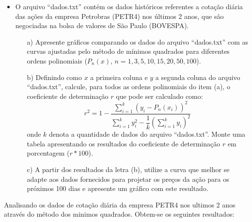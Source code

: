 \documentclass{article}
\newcounter{execs}
\newcommand{\exec}[0]{\addtocounter{execs}{1}\item[\textbf{\arabic{execs}.}]}
\begin{document}
\thispagestyle{first}
%    

\begin{itemize}

\exec O arquivo ``dados.txt'' contém os dados históricos referentes a cotação diária das ações da empresa Petrobras (PETR4) nos últimos 2 anos, que são negociadas na bolsa de valores de São Paulo (BOVESPA). 

\begin{itemize}

\item[a)] Apresente gráficos comparando os dados do arquivo ``dados.txt'' com as curvas ajustadas pelo método de mínimos quadrados para diferentes ordens polinomiais ($P_n(x)$, $n=1,3,5,10,15,20,50,100$).

\item[b)] Definindo como $x$ a primeira coluna e $y$ a segunda coluna do arquivo ``dados.txt'', calcule, para todos as ordens polinomiais do item (a), o coeficiente de determinação $r$ que pode ser calculado como:
$$
r^2= 1 - \dfrac{\displaystyle \sum_{i=1}^{k} \left(y_i-P_n(x_i) \right)^2}{\displaystyle \sum_{i=1}^{k} y_i^2 - \dfrac{1}{k} \left(\sum_{i=1}^{k} y_i \right)^2 }
$$
onde $k$ denota a quantidade de dados do arquivo ``dados.txt''. Monte uma tabela apresentando os resultados do coeficiente de determinação $r$ em porcentagem ($r*100$).

\item[c)] A partir dos resultados da letra (b), utilize a curva que melhor se adapte aos dados fornecidos para projetar os preços da ação para os próximos 100 dias e apresente um gráfico com este resultado. 

\end{itemize}

\end{itemize}

Analisando os dados de cotação diária da empresa PETR4 nos ultimos 2 anos através do método dos minimos quadrados. Obtem-se os seguintes resultados:
\end{document}
